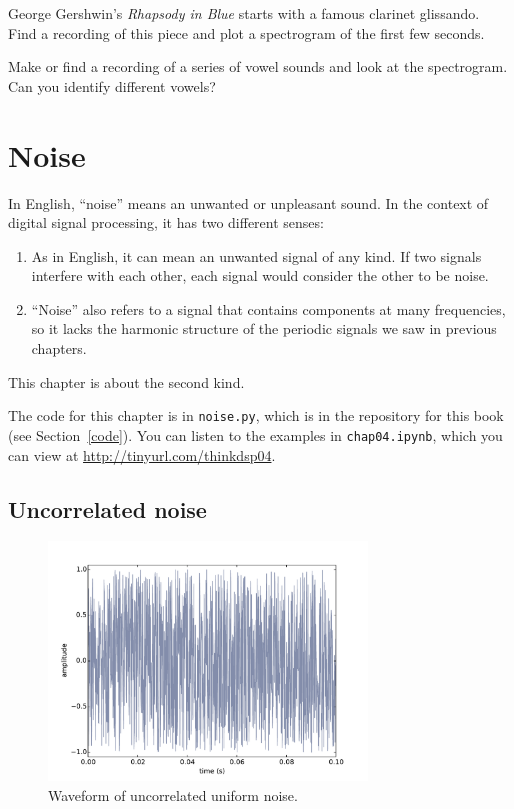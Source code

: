 \documentclass[12pt]{book}
\begin{document}
\begin{exercise}
George Gershwin's {\it Rhapsody in Blue} starts with a famous
clarinet glissando.  Find a recording of this piece and plot
a spectrogram of the first few seconds.

\end{exercise}

\begin{exercise}
Make or find a recording of a series of vowel sounds and look at the
spectrogram.  Can you identify different vowels?
\end{exercise}



\chapter{Noise}

In English, ``noise'' means an unwanted or unpleasant sound.  In the
context of digital signal processing, it has two different senses:

\begin{enumerate}

\item As in English, it can mean an unwanted signal of any kind.  If
two signals interfere with each other, each signal would consider
the other to be noise.

\item ``Noise'' also refers to a signal that contains components at
many frequencies, so it lacks the harmonic structure of the periodic
signals we saw in previous chapters.  

\end{enumerate}

This chapter is about the second kind.

The code for this chapter is in {\tt noise.py}, which is in the
repository for this book (see Section~\ref{code}).  You can listen
to the examples in {\tt chap04.ipynb}, which you can view at
\url{http://tinyurl.com/thinkdsp04}.

\section{Uncorrelated noise}

\begin{figure}
\centerline{\includegraphics[height=2.5in]{figs/whitenoise0.pdf}}
\caption{Waveform of uncorrelated uniform noise.}
\label{fig.whitenoise0}
\end{figure}
\end{document}
